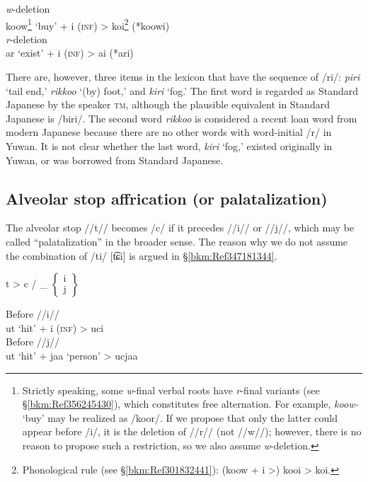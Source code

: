 \ex
\ea \textit{w}{}-deletion\\
     koow\footnote{Strictly speaking, some \textit{w}{}-final verbal roots have \textit{r}{}-final variants (see §\ref{bkm:Ref356245430}), which constitutes free alternation. For example, \textit{koow-} ‘buy’ may be realized as /koor/. If we propose that only the latter could appear before /i/, it is the deletion of //r// (not //w//); however, there is no reason to propose such a restriction, so we also assume \textit{w}{}-deletion.}   ‘buy’   +  i  (\textsc{inf})  >  koi\footnote{Phonological rule (see §\ref{bkm:Ref301832441}): (koow + i >) kooi > koi.}  (*koowi)\\
\ex \textit{r}{}-deletion\\
      ar   ‘exist’   +   i   (\textsc{inf})   >   ai   (*ari)\\
\z
\z

There are, however, three items in the lexicon that have the sequence of /ri/: \textit{piri} ‘tail end,’ \textit{rikkoo} ‘(by) foot,’ and \textit{kiri} ‘fog.’ The first word is regarded as Standard Japanese by the speaker \textsc{tm}, although the plausible equivalent in Standard Japanese is /biri/. The second word \textit{rikkoo} is considered a recent loan word from modern Japanese because there are no other words with word-initial /r/ in Yuwan. It is not clear whether the last word, \textit{kiri} ‘fog,’ existed originally in Yuwan, or was borrowed from Standard Japanese.

\subsection{Alveolar stop affrication (or palatalization)}
\label{bkm:Ref347180796}\hypertarget{RefHeadingToc395696979}{}
The alveolar stop //t// becomes /c/ if it precedes //i// or //j//, which may be called “palatalization” in the broader sense. The reason why we do not assume the combination of /ti/ [t͡ɕi] is argued in §\ref{bkm:Ref347181344}.

\ea t   >   c  /  \_ $\left\{\begin{array}{c} \text{i}\\\text{j}\end{array}\right\}$ 

\ex
\ea Before //i//\\
    ut   ‘hit’   +   i   (\textsc{inf})   >   uci\\
\ex Before //j//\\
    ut   ‘hit’   +   jaa   ‘person’   >   ucjaa\\
\z
\z


